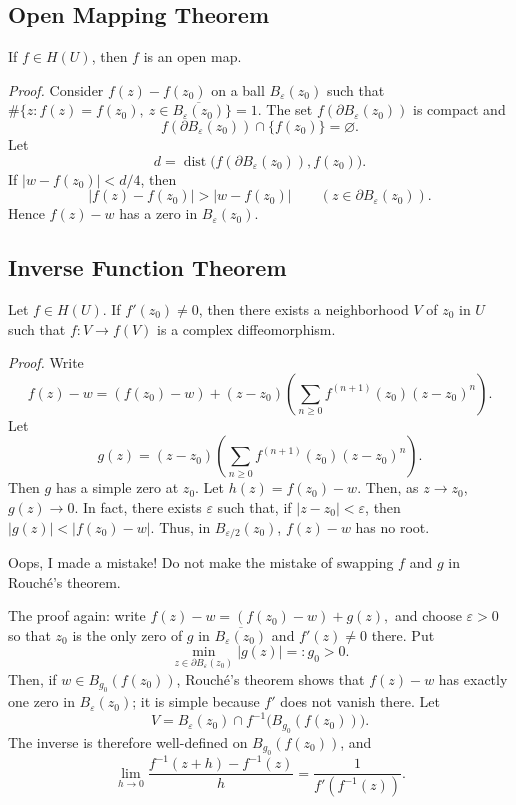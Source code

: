 \documentclass[11pt,a4paper]{article}
\begin{document}
\subsection*{Open Mapping Theorem}

If $f\in H(U)$, then $f$ is an open map.

\textit{Proof.}
Consider $f(z)-f(z_0)$ on a ball $B_\varepsilon(z_0)$ such that \(\#\{z:f(z)=f(z_0),\ z\in\overline{B_\varepsilon(z_0)}\}=1.\)
The set $f(\partial B_\varepsilon(z_0))$ is compact and
\[
  f(\partial B_\varepsilon(z_0))\cap\{f(z_0)\}=\varnothing.
\]
Let
\[
  d=\operatorname{dist}\bigl(f(\partial B_\varepsilon(z_0)),f(z_0)\bigr).
\]
If $|w-f(z_0)|<d/4$, then
\[
  |f(z)-f(z_0)|>|w-f(z_0)|
  \qquad(z\in\partial B_\varepsilon(z_0)).
\]
Hence $f(z)-w$ has a zero in $B_\varepsilon(z_0)$.

\subsection*{Inverse Function Theorem}

Let $f\in H(U)$. If $f'(z_0)\ne0$, then there exists a neighborhood $V$ of $z_0$ in $U$ such that \(f:V\to f(V)\)
is a complex diffeomorphism.

\textit{Proof.}
Write
\[
  f(z)-w=(f(z_0)-w)
  +(z-z_0)\left(\sum_{n\ge0}f^{(n+1)}(z_0)(z-z_0)^n\right).
\]
Let
\[
  g(z)=(z-z_0)\left(\sum_{n\ge0}f^{(n+1)}(z_0)(z-z_0)^n\right).
\]
Then $g$ has a simple zero at $z_0$. Let $h(z)=f(z_0)-w$. Then, as $z\to z_0$, $g(z)\to0$. In fact, there exists $\varepsilon$ such that, if $|z-z_0|<\varepsilon$, then $|g(z)|<|f(z_0)-w|$. Thus, in $B_{\varepsilon/2}(z_0)$, $f(z)-w$ has no root.

Oops, I made a mistake! Do not make the mistake of swapping $f$ and $g$ in Rouch\'e's theorem.

The proof again: write \(f(z)-w=(f(z_0)-w)+g(z),\) and choose $\varepsilon>0$ so that $z_0$ is the only zero of $g$ in $\overline{B_\varepsilon(z_0)}$ and $f'(z)\ne0$ there. Put
\[
  \min_{z\in\partial B_\varepsilon(z_0)}|g(z)|=:g_0>0.
\]
Then, if $w\in B_{g_0}(f(z_0))$, Rouch\'e's theorem shows that $f(z)-w$ has exactly one zero in $B_\varepsilon(z_0)$; it is simple because $f'$ does not vanish there. Let
\[
  V=B_\varepsilon(z_0)\cap f^{-1}\bigl(B_{g_0}(f(z_0))\bigr).
\]
The inverse is therefore well-defined on $B_{g_0}(f(z_0))$, and
\[
  \lim_{h\to0}
  \frac{f^{-1}(z+h)-f^{-1}(z)}{h}
  =\frac{1}{f'(f^{-1}(z))}.
\]
\end{document}

